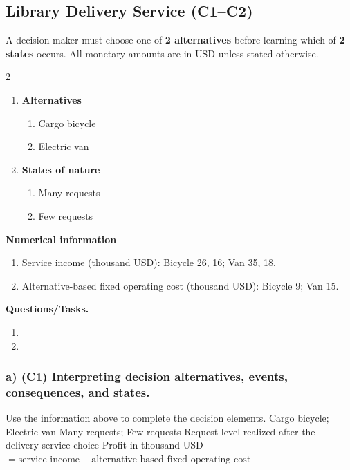 \subsection{Library Delivery Service (C1--C2)}
\label{sec:problem9-library-delivery-service-c1-c2}
A decision maker must choose one of \textbf{2 alternatives} before learning which of \textbf{2 states} occurs. All monetary amounts are in USD unless stated otherwise.
\begin{multicols}{2}
\begin{enumerate}[label=\arabic*.]
 \item \textbf{Alternatives}
 \begin{enumerate}[label=\roman*)]
  \item Cargo bicycle
  \item Electric van
 \end{enumerate}
 \item \textbf{States of nature}
 \begin{enumerate}[label=\roman*)]
  \item Many requests
  \item Few requests
 \end{enumerate}
\end{enumerate}
\end{multicols}
 \textbf{Numerical information}
 \begin{enumerate}[label=\roman*)]
  \item Service income (thousand USD): Bicycle 26, 16; Van 35, 18.
  \item Alternative-based fixed operating cost (thousand USD): Bicycle 9; Van 15.
 \end{enumerate}


\textbf{Questions/Tasks.}
\begin{enumerate}[label=\textbf{\alph*)}]
 \item {}
 \item {}
\end{enumerate}
\subsubsection*{a) \textbf{(C1)} Interpreting decision alternatives, events, consequences, and states.}
\label{subsec:problem9-library-delivery-service-c1}
Use the information above to complete the decision elements.
\DecisionElementsTable
{Cargo bicycle; Electric van}
{Many requests; Few requests}
{Request level realized after the delivery-service choice}
{Profit in thousand USD $= \text{service income} - \text{alternative-based fixed operating cost}$}
